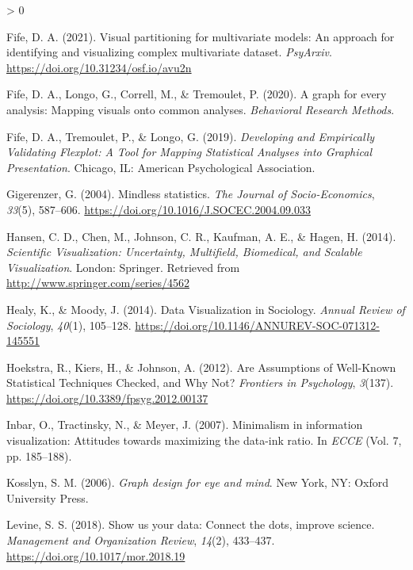 \documentclass[
  english,
  man]{apa6}
\newlength{\cslhangindent}
\newenvironment{CSLReferences}[2] %
 {%
  \setlength{\parindent}{0pt}
  \ifodd #1 \everypar{\setlength{\hangindent}{\cslhangindent}}\ignorespaces\fi
  \ifnum #2 > 0
  \setlength{\parskip}{#2\baselineskip}
  \fi
 }%
 {}
\begin{document}
\begin{CSLReferences}{1}{0}
\leavevmode\hypertarget{ref-fifeprp}{}%
Fife, D. A. (2021). Visual partitioning for multivariate models: An approach for identifying and visualizing complex multivariate dataset. \emph{PsyArxiv}. \url{https://doi.org/10.31234/osf.io/avu2n}

\leavevmode\hypertarget{ref-fife2020bb}{}%
Fife, D. A., Longo, G., Correll, M., \& Tremoulet, P. (2020). A graph for every analysis: Mapping visuals onto common analyses. \emph{Behavioral Research Methods}.

\leavevmode\hypertarget{ref-Fife2019d}{}%
Fife, D. A., Tremoulet, P., \& Longo, G. (2019). \emph{{Developing and Empirically Validating Flexplot: A Tool for Mapping Statistical Analyses into Graphical Presentation}}. Chicago, IL: American Psychological Association.

\leavevmode\hypertarget{ref-Gigerenzer2004}{}%
Gigerenzer, G. (2004). {Mindless statistics}. \emph{The Journal of Socio-Economics}, \emph{33}(5), 587--606. \url{https://doi.org/10.1016/J.SOCEC.2004.09.033}

\leavevmode\hypertarget{ref-Hansen}{}%
Hansen, C. D., Chen, M., Johnson, C. R., Kaufman, A. E., \& Hagen, H. (2014). \emph{{Scientific Visualization: Uncertainty, Multifield, Biomedical, and Scalable Visualization}}. London: Springer. Retrieved from \url{http://www.springer.com/series/4562}

\leavevmode\hypertarget{ref-Healy2014a}{}%
Healy, K., \& Moody, J. (2014). {Data Visualization in Sociology}. \emph{Annual Review of Sociology}, \emph{40}(1), 105--128. \url{https://doi.org/10.1146/ANNUREV-SOC-071312-145551}

\leavevmode\hypertarget{ref-hoekstra_are_2012}{}%
Hoekstra, R., Kiers, H., \& Johnson, A. (2012). {Are Assumptions of Well-Known Statistical Techniques Checked, and Why Not?} \emph{Frontiers in Psychology}, \emph{3}(137). \url{https://doi.org/10.3389/fpsyg.2012.00137}

\leavevmode\hypertarget{ref-inbar2007minimalism}{}%
Inbar, O., Tractinsky, N., \& Meyer, J. (2007). Minimalism in information visualization: Attitudes towards maximizing the data-ink ratio. In \emph{ECCE} (Vol. 7, pp. 185--188).

\leavevmode\hypertarget{ref-Kosslyn2006e}{}%
Kosslyn, S. M. (2006). \emph{Graph design for eye and mind}. New York, NY: Oxford University Press.

\leavevmode\hypertarget{ref-Levine2018}{}%
Levine, S. S. (2018). {Show us your data: Connect the dots, improve science}. \emph{Management and Organization Review}, \emph{14}(2), 433--437. \url{https://doi.org/10.1017/mor.2018.19}


\end{CSLReferences}
\end{document}
